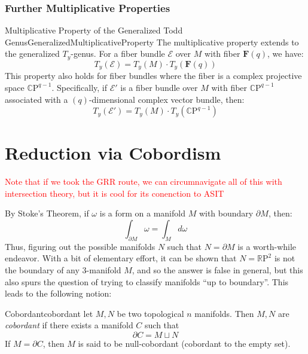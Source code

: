 \documentclass{book}
\newcommand{\CP}{\mathbb{C}\mathrm{P}}
\newcommand{\RP}{\mathbb{R}\mathrm{P}}
\newcommand{\dcup}{\sqcup}
\begin{document}
\subsection*{Further Multiplicative Properties}

\begin{thm}{Multiplicative Property of the Generalized Todd Genus}{GeneralizedMultiplicativeProperty}
The multiplicative property extends to the generalized $T_y$-genus. For a fiber bundle $\mathcal{E}$ over $M$ with fiber $\mathbf{F}(q)$, we have:
\[
T_y(\mathcal{E}) = T_y(M) \cdot T_y(\mathbf{F}(q))
\]
This property also holds for fiber bundles where the fiber is a complex projective space $\CP^{q-1}$. Specifically, if $\mathcal{E}'$ is a fiber bundle over $M$ with fiber $\CP^{q-1}$ associated with a $(q)$-dimensional complex vector bundle, then:
\[
T_y(\mathcal{E}') = T_y(M) \cdot T_y(\CP^{q-1})
\]
\end{thm}
%
%
%
%
%
%

















\chapter{Reduction via Cobordism}\label{cha:cobordism}

\textcolor{red}{Note that if we took the GRR route, we can circumnavigate all of this with intersection
theory, but it is cool for its conenction to ASIT}


By Stoke's Theorem, if $\omega$ is a form on a manifold $M$ with boundary $\partial M$, then:
\[
  \int_{\partial M} \omega = \int_M d\omega
\]
Thus, figuring out the possible manifolds $N$ such that $N = \partial M$ is a worth-while endeavor. With a bit
of elementary effort, it can be shown that $N = \RP^2$ is not the boundary of any $3$-manifold $M$, and so
the answer is false in general, but this also spurs the question of trying to classify manifolds ``up to
boundary''. This leads to the following notion:

\begin{defn}{Cobordant}{cobordant}
  let $M,N$ be two topological $n$ manifolds. Then $M,N$ are \emph{cobordant} if there exists a manifold $C$
  such that
  \[
    \partial C = M \dcup N
  \]
  If $M = \partial C$, then $M$ is said to be null-cobordant (cobordant to the empty set).
\end{defn}
\end{document}
